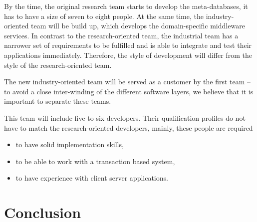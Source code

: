 \documentclass[a4paper, 10pt]{book}
\begin{document}
                                        By the time, the original research team starts to develop the
                                        meta-databases, it has to have a size of seven to eight people.
                                        At the same time, the industry-oriented team will be build up, which
                                        develops the domain-specific middleware services. In contrast to the
                                        research-oriented team, the industrial team has a narrower set of
                                        requirements to be fulfilled and is able to integrate and test their
                                        applications immediately. Therefore, the style of development will
                                        differ from the style of the research-oriented team.

                                        The new industry-oriented team will be served as a customer by the
                                        first team -- to avoid a close inter-winding of the different software
                                        layers, we believe that it is important to separate these teams.

                                        This team will include five to six developers. Their qualification
                                        profiles do not have to match the research-oriented developers,
                                        mainly, these people are required 
                                        \begin{itemize}
                                            \item to have solid implementation skills,
                                            \item to be able to work with a transaction based system,
                                            \item to have experience with client server applications. 
                                        \end{itemize}


                                        \section{Conclusion}
\end{document}
